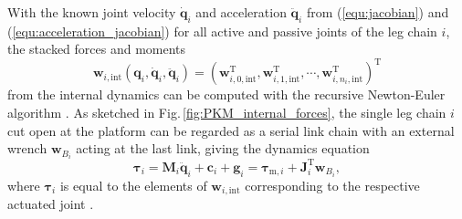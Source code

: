 \documentclass[fleqn,a4paper,10pt]{article}
\newcommand{\bm}[1]{\mathbf{#1}}
\newcommand{\transp}[0]{{\mathrm{T}}}
\renewenvironment{figure}
  {\par\vspace{6pt}\noindent\minipage{\linewidth}}
  {\endminipage\par\vspace{6pt}}
\begin{document}
\begin{multicols}{2}
With the known joint velocity $\dot{\bm{q}}_i$ and acceleration $\ddot{\bm{q}}_i$ from (\ref{equ:jacobian}) and (\ref{equ:acceleration_jacobian}) for all active and passive joints of the leg chain $i$, the stacked forces and moments
%
\begin{equation}
\bm{w}_{i,\mathrm{int}}(\bm{q}_i,\dot{\bm{q}}_i,\ddot{\bm{q}}_i)
=
(\bm{w}_{i,0,\mathrm{int}}^\transp,\bm{w}_{i,1,\mathrm{int}}^\transp,\cdots,\bm{w}_{i,n_i,\mathrm{int}}^\transp)^\transp
\label{equ:intforce_leg}
\end{equation} %
%
from the internal dynamics can be computed with the recursive Newton-Euler algorithm  \cite{KhalilDom2002,SaminFis2013}.
As sketched in Fig.\,\ref{fig:PKM_internal_forces}, the single leg chain $i$ cut open at the platform can be regarded as a serial link chain with an external wrench $\bm{w}_{B_i}$ acting at the last link, giving the dynamics equation
\begin{equation}
\bm{\tau}_{i}
=\bm{M}_i \ddot{\bm{q}}_i + \bm{c}_i + \bm{g}_i
=\bm{\tau}_{\mathrm{m},i} + \bm{J}_{i}^{\transp} \bm{w}_{B_i},
\label{equ:invdyn_leg}
\end{equation}
%
where $\bm{\tau}_{i}$ is equal to the elements of $\bm{w}_{i,\mathrm{int}}$ corresponding to the respective actuated joint \cite{KhalilDom2002}.

\begin{figure}
    \centering
    
    \vspace{-0.4cm} %
    \label{fig:PKM_internal_forces}
\end{figure}


\end{multicols}
\end{document}
